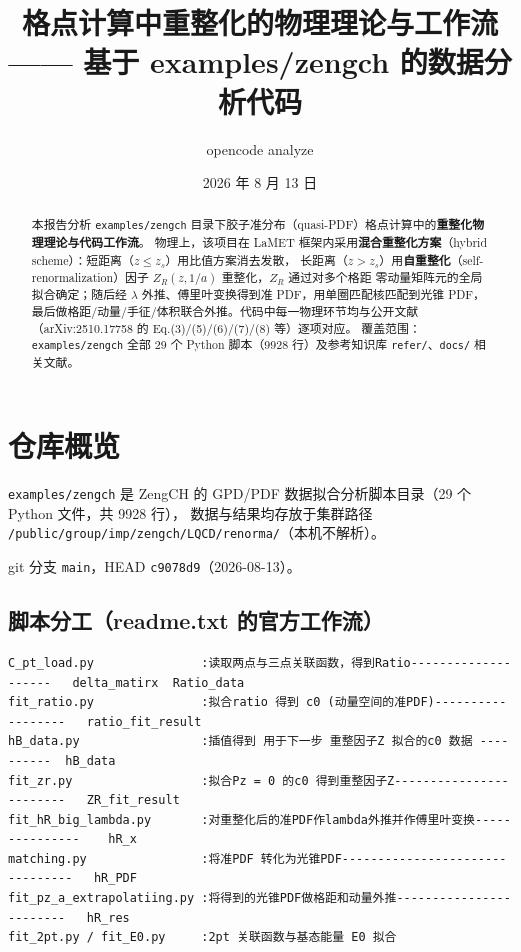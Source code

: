 \documentclass[UTF8]{ctexart}
\title{格点计算中重整化的物理理论与工作流\\ \large —— 基于 examples/zengch 的数据分析代码}
\author{opencode analyze}
\date{2026 年 8 月 13 日}
\begin{document}
\maketitle

\begin{abstract}
本报告分析 \texttt{examples/zengch} 目录下胶子准分布（quasi-PDF）格点计算中的\textbf{重整化物理理论与代码工作流}。
物理上，该项目在 LaMET 框架内采用\textbf{混合重整化方案}（hybrid scheme）：短距离（$z \le z_s$）用比值方案消去发散，
长距离（$z > z_s$）用\textbf{自重整化}（self-renormalization）因子 $Z_R(z, 1/a)$ 重整化，$Z_R$ 通过对多个格距
零动量矩阵元的全局拟合确定；随后经 $\lambda$ 外推、傅里叶变换得到准 PDF，用单圈匹配核匹配到光锥 PDF，
最后做格距/动量/手征/体积联合外推。代码中每一物理环节均与公开文献（arXiv:2510.17758 的 Eq.(3)/(5)/(6)/(7)/(8) 等）逐项对应。
覆盖范围：\texttt{examples/zengch} 全部 29 个 Python 脚本（9928 行）及参考知识库 \texttt{refer/}、\texttt{docs/} 相关文献。
\end{abstract}

\tableofcontents

\section{仓库概览}

\texttt{examples/zengch} 是 ZengCH 的 GPD/PDF 数据拟合分析脚本目录（29 个 Python 文件，共 9928 行），
数据与结果均存放于集群路径 \texttt{/public/group/imp/zengch/LQCD/renorma/}（本机不解析）。

git 分支 \texttt{main}，HEAD \texttt{c9078d9}（2026-08-13）。

\subsection{脚本分工（readme.txt 的官方工作流）}

\begin{lstlisting}[language={}]
C_pt_load.py               :读取两点与三点关联函数，得到Ratio--------------------   delta_matirx  Ratio_data
fit_ratio.py               :拟合ratio 得到 c0 (动量空间的准PDF)------------------   ratio_fit_result
hB_data.py                 :插值得到 用于下一步 重整因子Z 拟合的c0 数据 ----------  hB_data
fit_zr.py                  :拟合Pz = 0 的c0 得到重整因子Z------------------------   ZR_fit_result
fit_hR_big_lambda.py       :对重整化后的准PDF作lambda外推并作傅里叶变换---------------    hR_x
matching.py                :将准PDF 转化为光锥PDF--------------------------------   hR_PDF
fit_pz_a_extrapolatiing.py :将得到的光锥PDF做格距和动量外推------------------------   hR_res
fit_2pt.py / fit_E0.py     :2pt 关联函数与基态能量 E0 拟合
\end{lstlisting}
\end{document}
